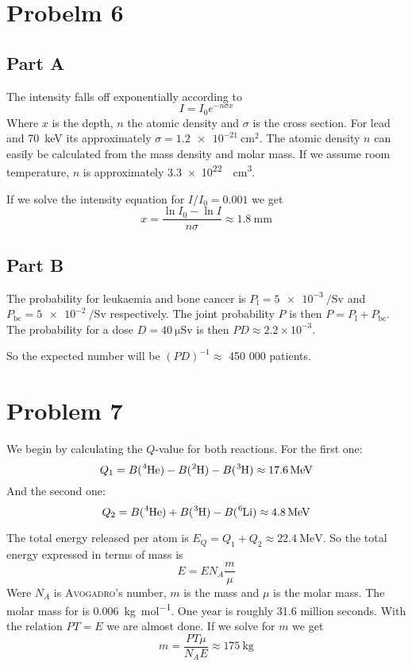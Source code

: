 \documentclass[a4paper, parskip=half, twopage]{scrartcl}
\begin{document}
\section*{Probelm 6}

\subsection*{Part A}

The intensity falls off exponentially according to
\[
I = I_0 e^{-n \sigma x}
\]
Where $x$ is the depth, $n$ the atomic density and $\sigma$ is the cross section. For lead and \SI{70}{\keV} its approximately $\sigma = \SI{1.2e-21}{\cm^2}$. The atomic density $n$ can easily be calculated from the mass density and molar mass. If we assume room temperature, $n$ is approximately \SI{3.3e22}{\per\cubic\centi\metre}.

If we solve the intensity equation for $I/I_0 = 0.001$ we get
\[
x = \frac{\ln I_0 - \ln I}{n \sigma} \approx \SI{1.8}{\mm}
\]

\subsection*{Part B}

The probability for leukaemia and bone cancer is $P_\mathrm{l} = \SI{5e-3}{\per\sievert}$ and $P_\mathrm{bc} = \SI{5e-2}{\per\sievert}$ respectively. The joint probability $P$ is then $P = P_\mathrm{l} + P_\mathrm{bc}$. The probability for a dose $D = \SI{40}{\micro \sievert}$ is then $PD \approx 2.2 \times 10^{-3}$.

So the expected number will be $(PD)^{-1} \approx$ 450 000 patients.

\section*{Problem 7}
We begin by calculating the $Q$-value for both reactions. For the first one:
\[
Q_1 = B(\ce{^{4}He}) - B(\ce{^{2}H}) - B(\ce{^{3}H}) \approx \SI{17.6}{\MeV}
\]
And the second one:
\[
Q_2 = B(\ce{^{4}He}) + B(\ce{^{3}H}) - B(\ce{^{6}Li}) \approx \SI{4.8}{\MeV}
\]

The total energy released per  atom is $E_Q = Q_1 + Q_2 \approx \SI{22.4}{\MeV}$. So the total energy expressed in terms of mass is 
\[
E = E N_A \frac{m}{\mu}
\]
Were $N_A$ is \textsc{Avogadro}'s number, $m$ is the mass and $\mu$ is the molar mass. The molar mass for  is \SI{0.006}{\kg \per \mole}. One year is roughly 31.6 million seconds. With the relation $PT = E$ we are almost done. If we solve for $m$ we get
\[
m = \frac{P T \mu}{N_A E} \approx \SI{175}{\kg}
\]
\end{document}
